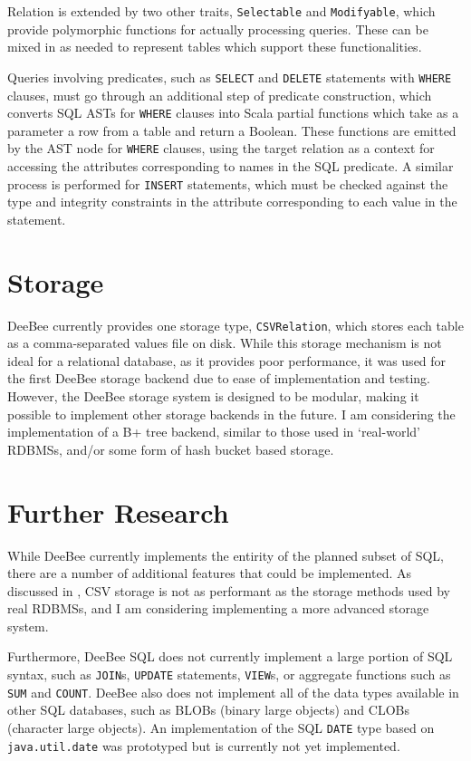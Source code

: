 Relation is extended by two other traits, \texttt{Selectable} and \texttt{Modifyable}, which provide polymorphic functions for actually processing queries. These can be mixed in as needed to represent tables which support these functionalities.

Queries involving predicates, such as \texttt{SELECT} and \texttt{DELETE} statements with \texttt{WHERE} clauses, must go through an additional step of predicate construction, which converts SQL ASTs for \texttt{WHERE} clauses into Scala partial functions which take as a parameter a row from a table and return a Boolean. These functions are emitted by the AST node for \texttt{WHERE} clauses, using the target relation as a context for accessing the attributes corresponding to names in the SQL predicate. A similar process is performed for \texttt{INSERT} statements, which must be checked against the type and integrity constraints in the attribute corresponding to each value in the statement.

\section{Storage}
\label{sec:storage}
DeeBee currently provides one storage type, \texttt{CSVRelation}, which stores each table as a comma-separated values file on disk. While this storage mechanism is not ideal for a relational database, as it provides poor performance, it was used for the first DeeBee storage backend due to ease of implementation and testing. However, the DeeBee storage system is designed to be modular, making it possible to implement other storage backends in the future. I am considering the implementation of a B+ tree backend, similar to those used in `real-world' RDBMSs, and/or some form of hash bucket based storage.

\section{Further Research}
While DeeBee currently implements the entirity of the planned subset of SQL, there are a number of additional features that could be implemented. As discussed in , CSV storage is not as performant as the storage methods used by real RDBMSs, and I am considering implementing a more advanced storage system. 

Furthermore, DeeBee SQL does not currently implement a large portion of SQL syntax, such as \texttt{JOIN}s, \texttt{UPDATE} statements, \texttt{VIEW}s, or aggregate functions such as \texttt{SUM} and \texttt{COUNT}. DeeBee also does not implement all of the data types available in other SQL databases, such as BLOBs (binary large objects) and CLOBs (character large objects). An implementation of the SQL \texttt{DATE} type based on \texttt{java.util.date} was prototyped but is currently not yet implemented. 

